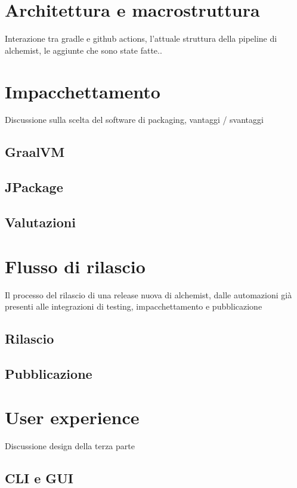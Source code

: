 \documentclass[12pt,a4paper,openright,twoside]{book}
\begin{document}
\section{Architettura e macrostruttura}
Interazione tra gradle e github actions, l’attuale struttura della pipeline di alchemist, le aggiunte che sono state fatte..

\section{Impacchettamento}
Discussione sulla scelta del software di packaging, vantaggi / svantaggi

\subsection{GraalVM}

\subsection{JPackage}

\subsection{Valutazioni}

\section{Flusso di rilascio}
Il processo del rilascio di una release nuova di alchemist, dalle automazioni già presenti alle integrazioni di testing, impacchettamento e pubblicazione
\subsection{Rilascio}

\subsection{Pubblicazione}

\section{User experience}
Discussione design della terza parte

\subsection{CLI e GUI}
\end{document}
